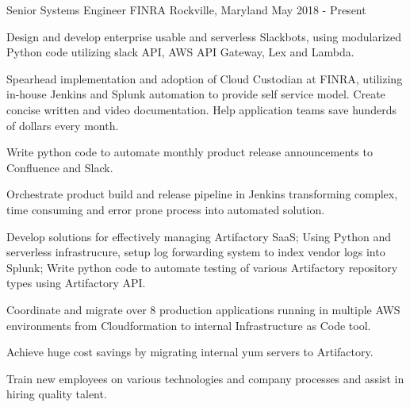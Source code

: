 

\begin{cventries}

  \cventryemp
    {Senior Systems Engineer} %
    {FINRA} %
    {Rockville, Maryland} %
    {May 2018 - Present} %
    {}
    {
      \begin{cvitems} %
        \item {Design and develop enterprise usable and serverless Slackbots, using modularized Python code utilizing slack API, AWS API Gateway, Lex and Lambda.}
        \item {Spearhead implementation and adoption of Cloud Custodian at FINRA, utilizing in-house Jenkins and Splunk automation to provide self service model. Create concise written and video documentation. Help application teams save hunderds of dollars every month.}
        \item {Write python code to automate monthly product release announcements to Confluence and Slack.}
        \item {Orchestrate product build and release pipeline in Jenkins transforming complex, time consuming and error prone process into automated solution.}
        \item {Develop solutions for effectively managing Artifactory SaaS; Using Python and serverless infrastrucure, setup log forwarding system to index vendor logs into Splunk; Write python code to automate testing of various Artifactory repository types using Artifactory API.}
        \item {Coordinate and migrate over 8 production applications running in multiple AWS environments from Cloudformation to internal Infrastructure as Code tool.}
        \item {Achieve huge cost savings by migrating internal yum servers to Artifactory.}
        \item {Train new employees on various technologies and company processes and assist in hiring quality talent.}
      \end{cvitems}
    }


\end{cventries}
